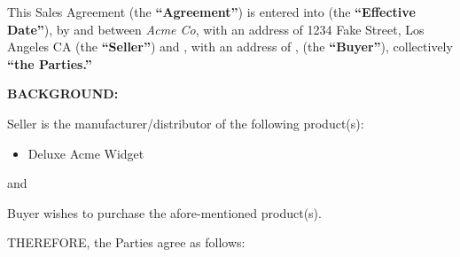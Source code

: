 \documentclass[letterpaper]{article}
\newcommand{\blank}[1]{\underline{\hspace{#1}}}
\begin{document}
    This Sales Agreement (the \textbf{``Agreement''}) is entered into \blank{3cm} (the \textbf{``Effective Date''}), by and between \emph{Acme Co}, with an address of 1234 Fake Street, Los Angeles CA (the \textbf{``Seller''}) and \blank{3cm}, with an address of \blank{5cm}, (the \textbf{``Buyer''}), collectively \textbf{``the Parties.''}

    \textbf{BACKGROUND:}

    Seller is the manufacturer/distributor of the following product(s):

    \begin{itemize}
        \item Deluxe Acme Widget
    \end{itemize}

    and

    Buyer wishes to purchase the afore-mentioned product(s).

    THEREFORE, the Parties agree as follows:
\end{document}
